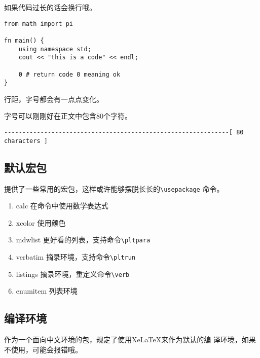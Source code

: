 \documentclass{peterlitsdoc}
\newcommand{\vb}{\verb}
\begin{document}
\begin{pltrun}
如果代码过长的话会换行哦。
\begin{lstlisting}
from math import pi

fn main() {
    using namespace std;
    cout << "this is a code" << endl;

    0 # return code 0 meaning ok
}
\end{lstlisting}

行距，字号都会有一点点变化。
\end{pltrun}

字号可以刚刚好在正文中包含80个字符。
\begin{lstlisting}
--------------------------------------------------------------[ 80 characters ]
\end{lstlisting}


\subsection{默认宏包}

提供了一些常用的宏包，这样或许能够摆脱长长的\vb|\usepackage|
命令。

\begin{enumerate}
    \item calc          \hfill 在命令中使用数学表达式
    \item xcolor        \hfill 使用颜色
    \item mdwlist
          \hfill 更好看的列表，支持命令\vb|\pltpara|
    \item verbatim      \hfill 摘录环境，支持命令\vb|\pltrun|
    \item listings      \hfill 摘录环境，重定义命令\verb|\verb|
    \item enumitem      \hfill 列表环境
\end{enumerate}


\subsection{编译环境}

作为一个面向中文环境的包，规定了使用XeLaTeX来作为默认的编
译环境，如果不使用，可能会报错哦。


\end{document}
